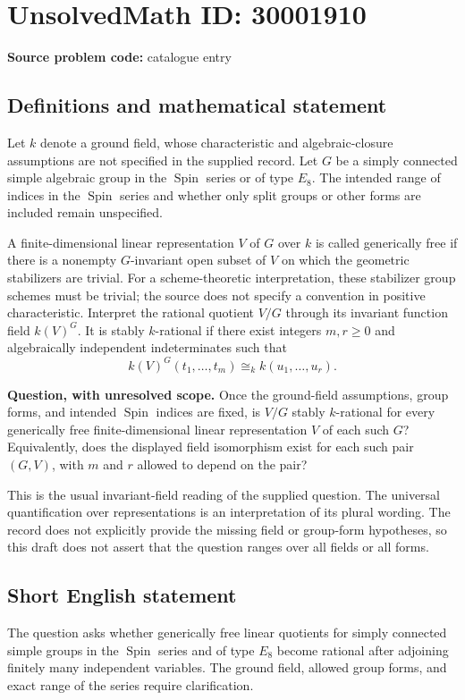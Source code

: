 \documentclass[11pt]{article}
\begin{document}
\section*{UnsolvedMath ID: 30001910}
\textbf{Source problem code:} catalogue entry
\subsection{Definitions and mathematical statement}
Let \(k\) denote a ground field, whose characteristic and algebraic-closure assumptions are not specified in the supplied record. Let \(G\) be a simply connected simple algebraic group in the \(\operatorname{Spin}\) series or of type \(E_8\). The intended range of indices in the \(\operatorname{Spin}\) series and whether only split groups or other forms are included remain unspecified.

A finite-dimensional linear representation \(V\) of \(G\) over \(k\) is called generically free if there is a nonempty \(G\)-invariant open subset of \(V\) on which the geometric stabilizers are trivial. For a scheme-theoretic interpretation, these stabilizer group schemes must be trivial; the source does not specify a convention in positive characteristic. Interpret the rational quotient \(V/G\) through its invariant function field \(k(V)^G\). It is stably \(k\)-rational if there exist integers \(m,r\geq 0\) and algebraically independent indeterminates such that
\[
 k(V)^G(t_1,\ldots,t_m)\cong_k k(u_1,\ldots,u_r).
\]

\textbf{Question, with unresolved scope.} Once the ground-field assumptions, group forms, and intended \(\operatorname{Spin}\) indices are fixed, is \(V/G\) stably \(k\)-rational for every generically free finite-dimensional linear representation \(V\) of each such \(G\)? Equivalently, does the displayed field isomorphism exist for each such pair \((G,V)\), with \(m\) and \(r\) allowed to depend on the pair?

This is the usual invariant-field reading of the supplied question. The universal quantification over representations is an interpretation of its plural wording. The record does not explicitly provide the missing field or group-form hypotheses, so this draft does not assert that the question ranges over all fields or all forms.
\subsection{Short English statement}
The question asks whether generically free linear quotients for simply connected simple groups in the \(\operatorname{Spin}\) series and of type \(E_8\) become rational after adjoining finitely many independent variables. The ground field, allowed group forms, and exact range of the series require clarification.
\end{document}
